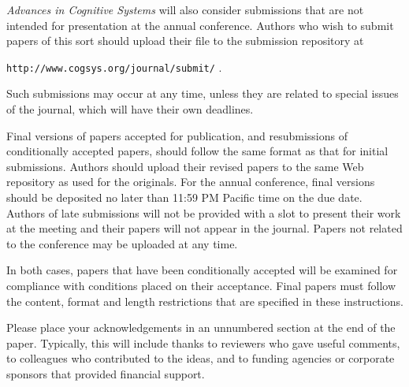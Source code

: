\documentclass[11pt,letterpaper]{article}
\begin{document}
{\it Advances in Cognitive Systems\/} will also consider submissions
that are not intended for presentation at the annual conference. 
Authors who wish to submit papers of this sort should upload their
file to the submission repository at
\vskip 0.1in
\begin{small}
\centerline{{\tt http://www.cogsys.org/journal/submit/} .}
\end{small}
\vskip 0.08in
\noindent
Such submissions may occur at any time, unless they are related to 
special issues of the journal, which will have their own deadlines. 


Final versions of papers accepted for publication, and resubmissions 
of conditionally accepted papers, should follow the same format 
as that for initial submissions. Authors should upload their revised 
papers to the same Web repository as used for the originals. 
For the annual conference, final versions should be deposited no 
later than 11:59 PM Pacific time on the due date. Authors of late 
submissions will not be provided with a slot to present their work 
at the meeting and their papers will not appear in the journal.
Papers not related to the conference may be uploaded at any time. 

In both cases, papers that have been conditionally accepted will be
examined for compliance with conditions placed on their acceptance. 
Final papers must follow the content, format and length restrictions 
that are specified in these instructions.

 
\begin{acknowledgements} 
\noindent
Please place your acknowledgements in an unnumbered section at the
end of the paper. Typically, this will include thanks to reviewers
who gave useful comments, to colleagues who contributed to the ideas, 
and to funding agencies or corporate sponsors that provided financial 
support.
\end{acknowledgements} 

\vspace{-0.25in}

{\parindent -10pt\leftskip 10pt\noindent



}

\end{document}
